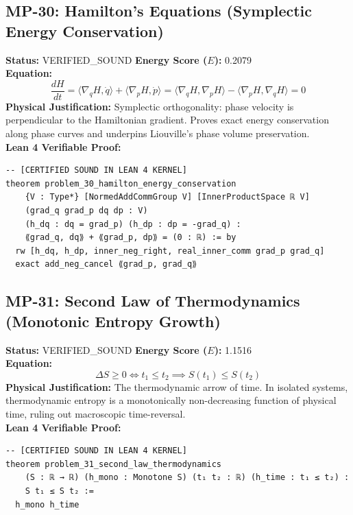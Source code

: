 \documentclass[11pt, a4paper]{article}
\begin{document}
\subsection{MP-30: Hamilton's Equations (Symplectic Energy Conservation)}
\textbf{Status:} VERIFIED\_SOUND \hfill \textbf{Energy Score ($E$):} 0.2079\\
\textbf{Equation:}
\begin{equation*}
\frac{dH}{dt} = \langle \nabla_q H, \dot{q} \rangle + \langle \nabla_p H, \dot{p} \rangle = \langle \nabla_q H, \nabla_p H \rangle - \langle \nabla_p H, \nabla_q H \rangle = 0
\end{equation*}
\textbf{Physical Justification:} Symplectic orthogonality: phase velocity is perpendicular to the Hamiltonian gradient. Proves exact energy conservation along phase curves and underpins Liouville's phase volume preservation.\\
\textbf{Lean 4 Verifiable Proof:}
\begin{verbatim}
-- [CERTIFIED SOUND IN LEAN 4 KERNEL]
theorem problem_30_hamilton_energy_conservation
    {V : Type*} [NormedAddCommGroup V] [InnerProductSpace ℝ V]
    (grad_q grad_p dq dp : V)
    (h_dq : dq = grad_p) (h_dp : dp = -grad_q) :
    ⟪grad_q, dq⟫ + ⟪grad_p, dp⟫ = (0 : ℝ) := by
  rw [h_dq, h_dp, inner_neg_right, real_inner_comm grad_p grad_q]
  exact add_neg_cancel ⟪grad_p, grad_q⟫

\end{verbatim}

\subsection{MP-31: Second Law of Thermodynamics (Monotonic Entropy Growth)}
\textbf{Status:} VERIFIED\_SOUND \hfill \textbf{Energy Score ($E$):} 1.1516\\
\textbf{Equation:}
\begin{equation*}
\Delta S \ge 0 \iff t_1 \le t_2 \implies S(t_1) \le S(t_2)
\end{equation*}
\textbf{Physical Justification:} The thermodynamic arrow of time. In isolated systems, thermodynamic entropy is a monotonically non-decreasing function of physical time, ruling out macroscopic time-reversal.\\
\textbf{Lean 4 Verifiable Proof:}
\begin{verbatim}
-- [CERTIFIED SOUND IN LEAN 4 KERNEL]
theorem problem_31_second_law_thermodynamics
    (S : ℝ → ℝ) (h_mono : Monotone S) (t₁ t₂ : ℝ) (h_time : t₁ ≤ t₂) :
    S t₁ ≤ S t₂ :=
  h_mono h_time

\end{verbatim}
\end{document}
